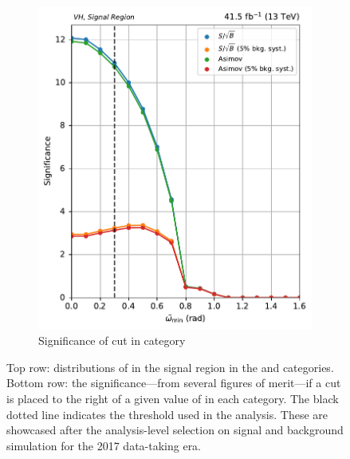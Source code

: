 \begin{figure}[htbp]
\begin{subfigure}[b]{0.35\textwidth}
        \includegraphics[width=\textwidth]{figures/category_optimisations/with_mindphi_cut/significance_VH_min_omega_tilde_all.pdf}
        \caption{Significance of cut in \VH category}
    \end{subfigure}
    \caption[Distributions of \omegaTilde in the signal region in the \ttH and \VH categories, along with the significance---from several figures of merit---if a cut is placed to the right of a given value]{Top row: distributions of \omegaTilde in the signal region in the \ttH and \VH categories. Bottom row: the significance---from several figures of merit---if a cut is placed to the right of a given value of \omegaTilde in each category. The black dotted line indicates the threshold used in the analysis. These are showcased after the analysis-level selection on signal and background simulation for the 2017 data-taking era.}
    \label{fig:htoinv_category_optimisations_significances}
\end{figure}


